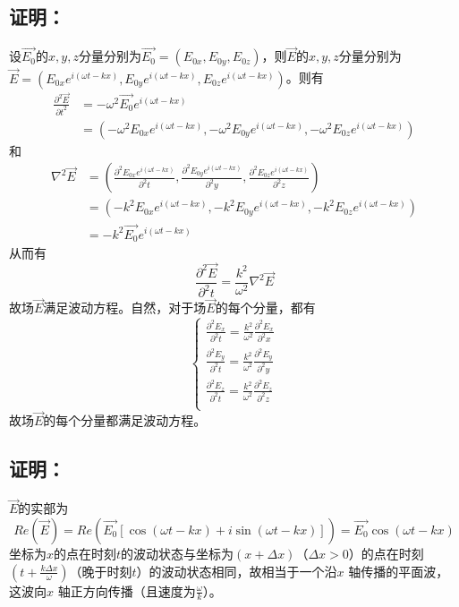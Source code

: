 \documentclass[10pt,a4paper]{article}
\theoremstyle{remark}
\begin{document}
\subsection{证明：}
设$\overrightarrow{E_0}$的$x,y,z$分量分别为$\overrightarrow{E_0} = (E_{0x},E_{0y},E_{0z})$，则$\overrightarrow{E}$的$x,y,z$分量分别为$\overrightarrow{E} = (E_{0x}e^{i(\omega t-kx)},E_{0y}e^{i(\omega t-kx)},E_{0z}e^{i(\omega t-kx)})$。则有
\[
\begin{split}
\frac{\partial^2\overrightarrow{E}}{{\partial t}^2} &= -\omega^2\overrightarrow{E_0}e^{i(\omega t-kx)}\\
&= (- \omega^2E_{0x}e^{i(\omega t-kx)},- \omega^2E_{0y}e^{i(\omega t-kx)},- \omega^2E_{0z}e^{i(\omega t-kx)})
\end{split}
\]
和
\[
\begin{split}
\nabla^2\overrightarrow{E} &= (\frac{\partial^2E_{0x}e^{i(\omega t-kx)}}{\partial^2t},\frac{\partial^2E_{0y}e^{i(\omega t-kx)}}{\partial^2y},\frac{\partial^2E_{0z}e^{i(\omega t-kx)}}{\partial^2z})\\
&= (- k^2E_{0x}e^{i(\omega t-kx)},- k^2E_{0y}e^{i(\omega t-kx)},- k^2E_{0z}e^{i(\omega t-kx)})\\
&= - k^2\overrightarrow{E_0}e^{i(\omega t-kx)}
\end{split}
\]
从而有
\[
\frac{\partial^2\overrightarrow{E}}{\partial^2t} = \frac{k^2}{\omega^2}\nabla^2\overrightarrow{E}
\]
故场$\overrightarrow{E}$满足波动方程。自然，对于场$\overrightarrow{E}$的每个分量，都有
\[
\left\{\begin{array}{l}
\frac{\partial^2E_x}{\partial^2t} = \frac{k^2}{\omega^2}\frac{\partial^2E_x}{\partial^2x}\\
\frac{\partial^2E_y}{\partial^2t} = \frac{k^2}{\omega^2}\frac{\partial^2E_y}{\partial^2y}\\
\frac{\partial^2E_z}{\partial^2t} = \frac{k^2}{\omega^2}\frac{\partial^2E_z}{\partial^2z}\\
\end{array}\right.
\]
故场$\overrightarrow{E}$的每个分量都满足波动方程。
\subsection{证明：}
$\overrightarrow{E}$的实部为
\[
Re(\overrightarrow{E}) = Re(\overrightarrow{E_0}[\cos(\omega t- kx) + i\sin(\omega t- kx)]) = \overrightarrow{E_0}\cos(\omega t- kx)
\]
坐标为$x$的点在时刻$t$的波动状态与坐标为$(x+\Delta x)$（$\Delta x>0$）的点在时刻$(t+\frac{k\Delta x}{\omega})$（晚于时刻$t$）的波动状态相同，故相当于一个沿$x$ 轴传播的平面波，这波向$x$ 轴正方向传播（且速度为$\frac{\omega}{k}$）。
\end{document}
